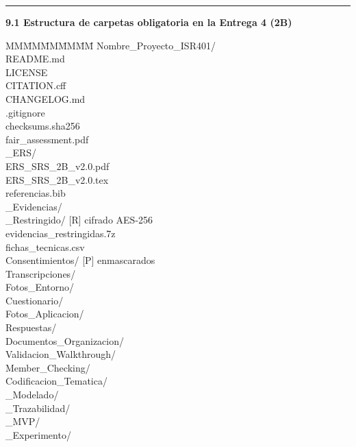 \documentclass[11pt,a4paper]{article}
\newcommand{\submark}[1]{\par\vspace{4pt}\noindent
    {\color{uteqgreen}\rule[-1pt]{3.5pt}{12pt}}\hspace{6pt}\textbf{\color{uteqgreen}#1}\par\vspace{2pt}}
\begin{document}
\submark{9.1 Estructura de carpetas obligatoria en la Entrega 4 (2B)}
\begin{evidbox}[title=Árbol de carpetas obligatorio de la Entrega 4 (2B / Defensa)]
    \begingroup
        \footnotesize\ttfamily
        \begin{tabbing}
            MM\=MM\=MM\=MM\=MM\=\kill
            Nombre\_Proyecto\_ISR401/\\
            \>README.md\\
            \>LICENSE\\
            \>CITATION.cff\\
            \>CHANGELOG.md\\
            \>.gitignore\\
            \>checksums.sha256\\
            \>fair\_assessment.pdf\\
            \_ERS/\\
            \>\>ERS\_SRS\_2B\_v2.0.pdf\\
            \>\>ERS\_SRS\_2B\_v2.0.tex\\
            \>\>referencias.bib\\
            \_Evidencias/\\
            \>\_Restringido/ [R] cifrado AES-256\\
            \>\>\>evidencias\_restringidas.7z\\
            \>\>\>fichas\_tecnicas.csv\\
            \>\>Consentimientos/ [P] enmascarados\\
            \>\>Transcripciones/\\
            \>\>Fotos\_Entorno/\\
            \>\>Cuestionario/\\
            \>\>\>Fotos\_Aplicacion/\\
            \>\>\>Respuestas/\\
            \>\>Documentos\_Organizacion/\\
            \>\>Validacion\_Walkthrough/\\
            \>\>Member\_Checking/\\
            \>\>Codificacion\_Tematica/\\
            \_Modelado/\\
            \_Trazabilidad/\\
            \_MVP/\\
            \_Experimento/\\

\end{tabbing}
\end{evidbox}
\end{document}

